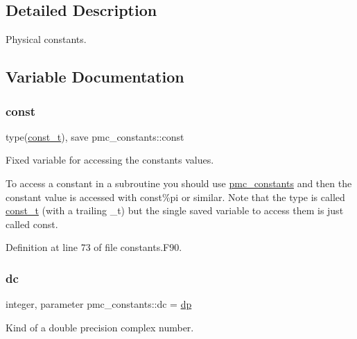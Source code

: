 \subsection{Detailed Description}
Physical constants. 

\subsection{Variable Documentation}
\mbox{\label{namespacepmc__constants_a9235496969530bdb34cac4c63c1a56ed}} 
\subsubsection{\texorpdfstring{const}{const}}
{\footnotesize\ttfamily type(\mbox{\hyperlink{structpmc__constants_1_1const__t}{const\+\_\+t}}), save pmc\+\_\+constants\+::const}



Fixed variable for accessing the constant\textquotesingle{}s values. 

To access a constant in a subroutine you should {\ttfamily use \mbox{\hyperlink{namespacepmc__constants}{pmc\+\_\+constants}}} and then the constant value is accessed with {\ttfamily const\%pi} or similar. Note that the type is called {\ttfamily \mbox{\hyperlink{structpmc__constants_1_1const__t}{const\+\_\+t}}} (with a trailing \+\_\+t) but the single saved variable to access them is just called {\ttfamily const}. 

Definition at line 73 of file constants.\+F90.

\mbox{\label{namespacepmc__constants_a0588e47a1de113908772c0566ff3496f}} 
\subsubsection{\texorpdfstring{dc}{dc}}
{\footnotesize\ttfamily integer, parameter pmc\+\_\+constants\+::dc = \mbox{\hyperlink{namespacepmc__constants_a396b7709ed4da67dac74cb46a1466ed6}{dp}}}



Kind of a double precision complex number. 



